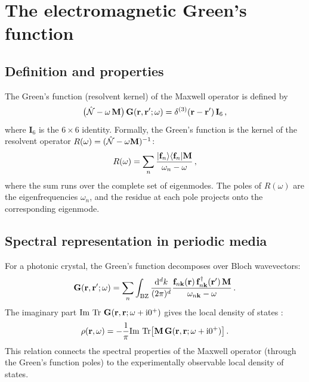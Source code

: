 \section{The electromagnetic Green's function}
\label{sec:appA-green}

\subsection{Definition and properties}
\label{sec:appA-green-def}

The Green's function (resolvent kernel) of the Maxwell operator is
defined by
\begin{equation}\label{eq:appA-green-def}
  \bigl(\hat{\mathcal{N}} - \omega\,\mathbf{M}\bigr)\,
  \mathbf{G}(\mathbf{r},\mathbf{r}';\omega)
  = \delta^{(3)}(\mathbf{r}-\mathbf{r}')\,\mathbf{I}_6\,,
\end{equation}
where $\mathbf{I}_6$ is the $6\times 6$ identity.  Formally, the
Green's function is the kernel of the resolvent operator
$R(\omega)=(\hat{\mathcal{N}}-\omega\mathbf{M})^{-1}$:
\begin{equation}\label{eq:appA-resolvent}
  R(\omega) = \sum_n
  \frac{|\mathbf{f}_n\rangle\langle\mathbf{f}_n|\mathbf{M}}
  {\omega_n-\omega}\,,
\end{equation}
where the sum runs over the complete set of eigenmodes.  The poles of
$R(\omega)$ are the eigenfrequencies $\omega_n$, and the residue at
each pole projects onto the corresponding eigenmode.

\subsection{Spectral representation in periodic media}
\label{sec:appA-green-periodic}

For a photonic crystal, the Green's function decomposes over Bloch
wavevectors:
\begin{equation}\label{eq:appA-green-bloch}
  \mathbf{G}(\mathbf{r},\mathbf{r}';\omega)
  = \sum_n\int_{\mathrm{BZ}}\frac{\mathrm{d}^d k}{(2\pi)^d}
  \frac{\mathbf{f}_{n\mathbf{k}}(\mathbf{r})\,
  \mathbf{f}_{n\mathbf{k}}^\dagger(\mathbf{r}')\,\mathbf{M}}
  {\omega_{n\mathbf{k}}-\omega}\,.
\end{equation}
The imaginary part $\mathrm{Im}\,\operatorname{Tr}\,\mathbf{G}(\mathbf{r},\mathbf{r};\omega+\mathrm{i} 0^+)$
gives the local density of states
\cite{ozawa2018topological}:
\begin{equation}\label{eq:appA-ldos}
  \rho(\mathbf{r},\omega)
  = -\frac{1}{\pi}\mathrm{Im}\,\operatorname{Tr}\bigl[\mathbf{M}\,
  \mathbf{G}(\mathbf{r},\mathbf{r};\omega+\mathrm{i} 0^+)\bigr]\,.
\end{equation}
This relation connects the spectral properties of the Maxwell operator
(through the Green's function poles) to the experimentally observable
local density of states.

